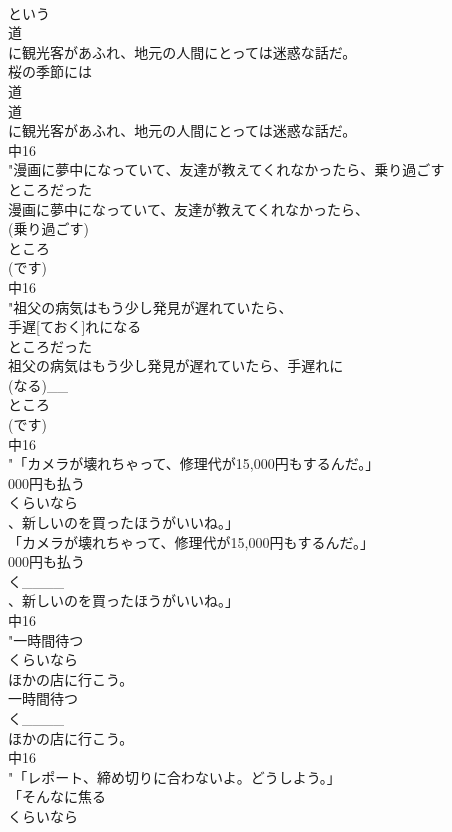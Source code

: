 \documentclass[8pt]{extreport}
\begin{document}
\begin{CJK}{UTF8}{min}
\\	という
\\	道
\\	に観光客があふれ、地元の人間にとっては迷惑な話だ。
\\	桜の季節には
\\	道
\\	道
\\	に観光客があふれ、地元の人間にとっては迷惑な話だ。
\\	中16
\\	"漫画に夢中になっていて、友達が教えてくれなかったら、乗り過ごす
\\	ところだった
\\	漫画に夢中になっていて、友達が教えてくれなかったら、
\\	(乗り過ごす)
\\	ところ
\\	(です)
\\	中16
\\	"祖父の病気はもう少し発見が遅れていたら、
\\	手遅[ておく]れになる
\\	ところだった
\\	祖父の病気はもう少し発見が遅れていたら、手遅れに
\\	(なる)__
\\	ところ
\\	(です)
\\	中16
\\	"「カメラが壊れちゃって、修理代が15,000円もするんだ。」
\\	000円も払う
\\	くらいなら
\\	、新しいのを買ったほうがいいね。」
\\	「カメラが壊れちゃって、修理代が15,000円もするんだ。」
\\	000円も払う
\\	く____
\\	、新しいのを買ったほうがいいね。」
\\	中16
\\	"一時間待つ
\\	くらいなら
\\	ほかの店に行こう。
\\	一時間待つ
\\	く____
\\	ほかの店に行こう。
\\	中16
\\	"「レポート、締め切りに合わないよ。どうしよう。」
\\	「そんなに焦る
\\	くらいなら

\end{CJK}
\end{document}
